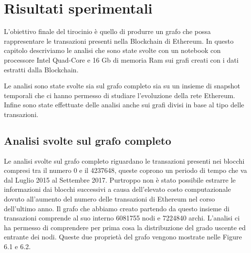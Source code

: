 \documentclass[12pt]{report}
\begin{document}
\chapter{Risultati sperimentali}

L'obiettivo finale del tirocinio è quello di produrre un grafo che possa rappresentare le transazioni presenti nella Blockchain di Ethereum. In questo capitolo descriviamo le analisi che sono state svolte con un notebook con processore Intel Quad-Core e 16 Gb di memoria Ram sui grafi creati con i dati estratti dalla Blockchain.

Le analisi sono state svolte sia sul grafo completo sia su un insieme di snapshot temporali che ci hanno permesso di studiare l'evoluzione della rete Ethereum.
Infine sono state effettuate delle analisi anche sui grafi divisi in base al tipo delle transazioni.

\section{Analisi svolte sul grafo completo}

Le analisi svolte sul grafo completo riguardano le transazioni presenti nei blocchi compresi tra il numero 0 e il 4237648, queste coprono un periodo di tempo che va dal Luglio 2015 al Settembre 2017. Purtroppo non è stato possibile estrarre le informazioni dai blocchi successivi a causa dell'elevato costo computazionale dovuto all'aumento del numero delle transazioni di Ethereum nel corso dell'ultimo anno.
Il grafo che abbiamo creato partendo da questo insieme di transazioni comprende al suo interno 6081755 nodi e 7224840 archi.
L'analisi ci ha permesso di comprendere per prima cosa la distribuzione del grado uscente ed entrante dei nodi.
Queste due proprietà del grafo vengono mostrate nelle Figure 6.1 e 6.2.
\end{document}
